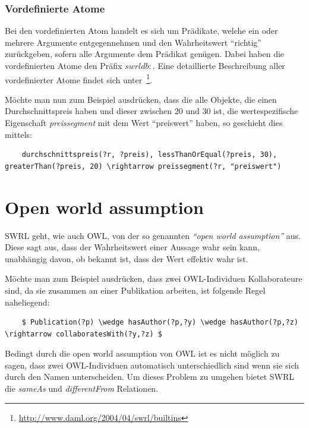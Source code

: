 \subsubsection{Vordefinierte Atome}
\label{ssubsec:swrl_aufbau_atomaretypen_vordefinierteatome}
Bei den vordefinierten Atom handelt es sich um Prädikate, welche ein oder mehrere Argumente entgegennehmen und den Wahrheitswert ``richtig'' zurückgeben, sofern alle Argumente dem Prädikat genügen. Dabei haben die vordefinierten Atome den Präfix $ swrldb: $. Eine detaillierte Beschreibung aller vordefinierter Atome findet sich unter~\footnote{\url{http://www.daml.org/2004/04/swrl/builtins}}.

Möchte man nun zum Beispiel ausdrücken, dass die alle Objekte, die einen Durchschnittspreis haben und dieser zwischen 20 und 30 ist, die wertespezifische Eigenschaft \textit{preissegment} mit dem Wert ``preiswert'' haben, so geschieht dies mittels:
\lstset{language=XML}
\begin{lstlisting}
    durchschnittspreis(?r, ?preis), lessThanOrEqual(?preis, 30), greaterThan(?preis, 20) \rightarrow preissegment(?r, "preiswert")
\end{lstlisting}

\newpage

\section{Open world assumption}
\label{sec:swrl_openworldassumption}
SWRL geht, wie auch OWL, von der so genannten \textit{``open world assumption''} aus. Diese sagt aus, dass der Wahrheitswert einer Aussage wahr sein kann, unabhängig davon, ob bekannt ist, dass der Wert effektiv wahr ist.

Möchte man zum Beispiel ausdrücken, dass zwei OWL-Individuen Kollaborateure sind, da sie zusammen an einer Publikation arbeiten, ist folgende Regel naheliegend:

\lstset{language=XML}
\begin{lstlisting}
    $ Publication(?p) \wedge hasAuthor(?p,?y) \wedge hasAuthor(?p,?z) \rightarrow collaboratesWith(?y,?z) $
\end{lstlisting}

Bedingt durch die open world assumption von OWL ist es nicht möglich zu sagen, dass zwei OWL-Individuen automatisch unterschiedlich sind wenn sie sich durch den Namen unterscheiden. Um dieses Problem zu umgehen bietet SWRL die \textit{sameAs} und \textit{differentFrom} Relationen.

